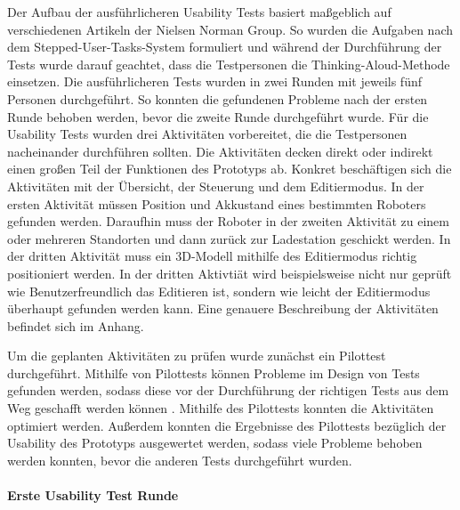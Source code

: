 Der Aufbau der ausführlicheren Usability Tests basiert maßgeblich auf verschiedenen Artikeln der Nielsen Norman Group. So wurden die Aufgaben nach dem Stepped-User-Tasks-System \cite{Pernice.2020} formuliert und während der Durchführung der Tests wurde darauf geachtet, dass die Testpersonen die Thinking-Aloud-Methode \cite{Nielsen.2012b} einsetzen. Die ausführlicheren Tests wurden in zwei Runden mit jeweils fünf Personen durchgeführt. So konnten die gefundenen Probleme nach der ersten Runde behoben werden, bevor die zweite Runde durchgeführt wurde. Für die Usability Tests wurden drei Aktivitäten vorbereitet, die die Testpersonen nacheinander durchführen sollten. Die Aktivitäten decken direkt oder indirekt einen großen Teil der Funktionen des Prototyps ab. Konkret beschäftigen sich die Aktivitäten mit der Übersicht, der Steuerung und dem Editiermodus. In der ersten Aktivität müssen Position und Akkustand eines bestimmten Roboters gefunden werden. Daraufhin muss der Roboter in der zweiten Aktivität zu einem oder mehreren Standorten und dann zurück zur Ladestation geschickt werden. In der dritten Aktivität muss ein 3D-Modell mithilfe des Editiermodus richtig positioniert werden. In der dritten Aktivtiät wird beispielsweise nicht nur geprüft wie Benutzerfreundlich das Editieren ist, sondern wie leicht der Editiermodus überhaupt gefunden werden kann. Eine genauere Beschreibung der Aktivitäten befindet sich im Anhang.

Um die geplanten Aktivitäten zu prüfen wurde zunächst ein Pilottest durchgeführt.
Mithilfe von Pilottests können Probleme im Design von Tests gefunden werden, sodass diese vor der Durchführung der richtigen Tests aus dem Weg geschafft werden können \cite{Schade.2015}. Mithilfe des Pilottests konnten die Aktivitäten optimiert werden. Außerdem konnten die Ergebnisse des Pilottests bezüglich der Usability des Prototyps ausgewertet werden, sodass viele Probleme behoben werden konnten, bevor die anderen Tests durchgeführt wurden.

\paragraph{Erste Usability Test Runde}

